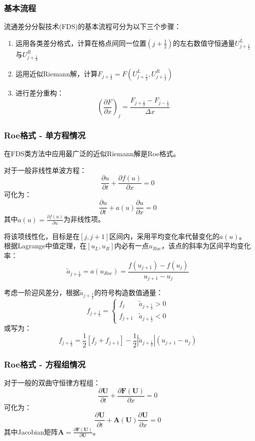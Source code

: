 \documentclass[12pt,a4paper]{article}
\begin{document}
\subsubsection{基本流程}
流通差分分裂技术(FDS)的基本流程可分为以下三个步骤：

\begin{enumerate}
    \item 运用各类差分格式，计算在格点间同一位置$(j+\frac{1}{2})$的左右数值守恒通量$U_{j+\frac{1}{2}}^{L}$与$U_{j+\frac{1}{2}}^{R}$
    
    \item 运用近似Riemann解，计算$F_{j+\frac{1}{2}}=F\left(U_{j+\frac{1}{2}}^{L},U_{j+\frac{1}{2}}^{R}\right)$
    
    \item 进行差分重构：
    $$
    \left(\frac{\partial F}{\partial x}\right)_{j}=\frac{F_{j+\frac{1}{2}}-F_{j-\frac{1}{2}}}{\Delta x}
    $$
\end{enumerate}

\subsubsection{Roe格式 - 单方程情况}
在FDS类方法中应用最广泛的近似Riemann解是Roe格式。

对于一般非线性单波方程：
$$
\frac{\partial u}{\partial t}+\frac{\partial f(u)}{\partial x}=0
$$
可化为：
$$
\frac{\partial u}{\partial t}+a(u)\frac{\partial u}{\partial x}=0
$$
其中$a(u)=\frac{\partial f(u)}{\partial u}$为非线性项。

将该项线性化，目标是在$[j,j+1]$区间内，采用平均变化率代替变化的$a(u)$。根据Lagrange中值定理，在$[u_L,u_R]$内必有一点$u_{Roe}$，该点的斜率为区间平均变化率：
$$
\widetilde{a}_{j+\frac{1}{2}} = a(u_{Roe}) = \frac{f(u_{j+1})-f(u_j)}{u_{j+1}-u_j}
$$

考虑一阶迎风差分，根据$\widetilde{a}_{j+\frac{1}{2}}$的符号构造数值通量：
$$
f_{j+\frac{1}{2}}=\begin{cases} 
f_j & \widetilde{a}_{j+\frac{1}{2}} > 0 \\
f_{j+1} & \widetilde{a}_{j+\frac{1}{2}} < 0 
\end{cases}
$$
或写为：
$$
f_{j+\frac{1}{2}}=\frac{1}{2}\left[f_j + f_{j+1}\right]-\frac{1}{2}\left|\widetilde{a}_{j+\frac{1}{2}}\right|(u_{j+1}-u_j)
$$

\subsubsection{Roe格式 - 方程组情况}
对于一般的双曲守恒律方程组：
$$
\frac{\partial \mathbf{U}}{\partial t} + \frac{\partial \mathbf{F}(\mathbf{U})}{\partial x} = 0
$$
可化为：
$$
\frac{\partial \mathbf{U}}{\partial t} + \mathbf{A}(\mathbf{U})\frac{\partial \mathbf{U}}{\partial x} = 0
$$
其中Jacobian矩阵$\mathbf{A} = \frac{\partial \mathbf{F}(\mathbf{U})}{\partial \mathbf{U}}$。
\end{document}

